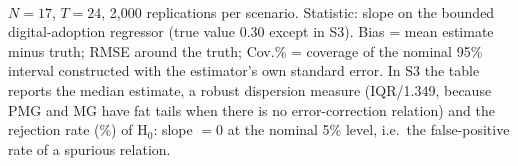\\[3pt]\begin{minipage}{\tablewidth}\footnotesize $N=17$, $T=24$, 2,000 replications per scenario. Statistic: slope on the bounded digital-adoption regressor (true value 0.30 except in S3). Bias = mean estimate minus truth; RMSE around the truth; Cov.\% = coverage of the nominal 95\% interval constructed with the estimator's own standard error. In S3 the table reports the median estimate, a robust dispersion measure (IQR/1.349, because PMG and MG have fat tails when there is no error-correction relation) and the rejection rate (\%) of H$_0$: slope $=0$ at the nominal 5\% level, i.e.\ the false-positive rate of a spurious relation.\end{minipage}
